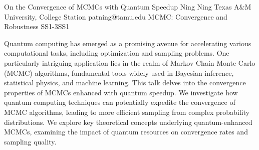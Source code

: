 \begin{talk}
  {On the Convergence of MCMCs with Quantum Speedup}%
  {Ning Ning}%
  {Texas A\&M University, College Station}%
  {patning@tamu.edu}%
  {}%
{MCMC: Convergence and Robustness}
{}{SS1-3}{SS1}


				
				

Quantum computing has emerged as a promising avenue for accelerating various computational tasks, including optimization and sampling problems. One particularly intriguing application lies in the realm of Markov Chain Monte Carlo (MCMC) algorithms, fundamental tools widely used in Bayesian inference, statistical physics, and machine learning. This talk delves into the convergence properties of MCMCs enhanced with quantum speedup. We investigate how quantum computing techniques can potentially expedite the convergence of MCMC algorithms, leading to more efficient sampling from complex probability distributions. 
We explore key theoretical concepts underlying quantum-enhanced MCMCs, examining the impact of quantum resources on convergence rates and sampling quality.
\end{talk}

